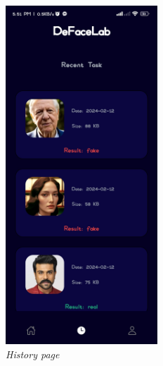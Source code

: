 \begin{figure}[ht]
    \centering
    \includegraphics[height= 5in]{img/History.jpg}
    \caption{\textit{History page}}
\end{figure}

